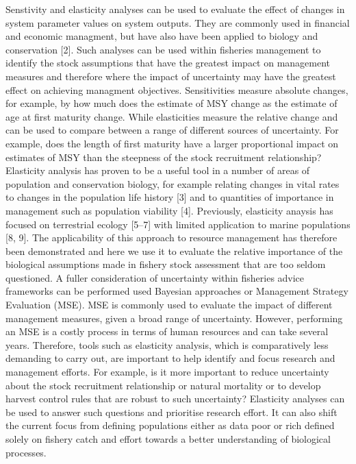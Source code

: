 \documentclass{pnastwo}
\begin{document}
\begin{article}
Senstivity and elasticity analyses can be used to evaluate the eﬀect of changes in system parameter values on system outputs. They are commonly used in ﬁnancial and economic managment, but have also have been applied to biology and conservation [2]. Such analyses can be used within ﬁsheries management to identify the stock assumptions that have the greatest impact on management measures and therefore where the impact of uncertainty may have the greatest eﬀect on achieving managment objectives. Sensitivities measure absolute changes, for example, by how much does the estimate of MSY change as the estimate of age at ﬁrst maturity change. While elasticities measure the relative change and can be used to compare between a range of diﬀerent sources of uncertainty. For example, does the length of ﬁrst maturity have a larger proportional impact on estimates of MSY than the steepness of the stock recruitment relationship? Elasticity analysis has proven to be a useful tool in a number of areas of population and conservation biology, for example relating changes in vital rates to changes in the population life history [3] and to quantities of importance in management such as population viability [4]. Previously, elasticity anaysis has focused on terrestrial ecology [5–7] with limited application to marine populations [8, 9]. The applicability of this approach to resource management has therefore been demonstrated and here we use it to evaluate the relative importance of the biological assumptions made in ﬁshery stock assessment that are too seldom questioned. 
A fuller consideration of uncertainty within ﬁsheries advice frameworks can be performed used Bayesian approaches or Management Strategy Evaluation (MSE). MSE is commonly used to evaluate the impact of diﬀerent management measures, given a broad range of uncertainty. However, performing an MSE is a costly process in terms of human resources and can take several years. Therefore, tools such as elasticity analysis, which is comparatively less demanding to carry out, are important to help identify and focus research and management eﬀorts. For example, is it more important to reduce uncertainty about the stock recruitment relationship or natural mortality or to develop harvest control rules that are robust to such uncertainty? Elasticity analyses can be used to answer such questions and prioritise research eﬀort. It can also shift the current focus from deﬁning populations either as data poor or rich deﬁned solely on ﬁshery catch and eﬀort towards a better understanding of biological processes. 

\end{article}
\end{document}
